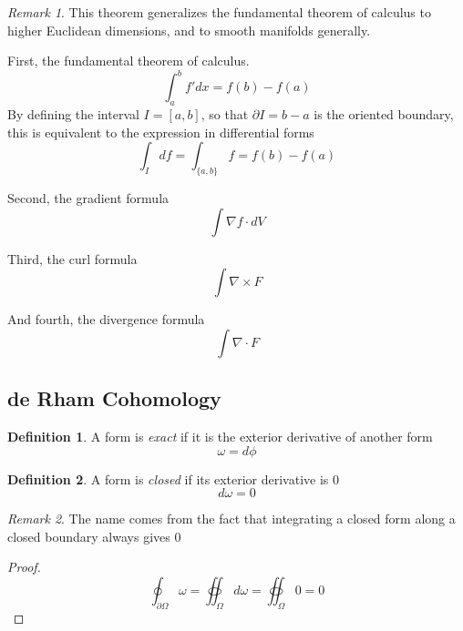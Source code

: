 \documentclass[12pt]{article}
\theoremstyle{definition}
\newtheorem{definition}{Definition}[section]
\theoremstyle{remark}
\newtheorem*{remark}{Remark}
\theoremstyle{example}
\theoremstyle{theorem}
\theoremstyle{lemma}
\begin{document}
\begin{remark}
	This theorem generalizes the fundamental theorem of calculus to higher Euclidean dimensions, and to smooth manifolds generally.
	
	First, the fundamental theorem of calculus.
	\begin{equation}
		\int_a^bf'dx=f(b)-f(a)
	\end{equation}
	By defining the interval $I=[a,b]$, so that $\partial I=b-a$ is the oriented boundary, this is equivalent to the expression in differential forms
	\begin{equation}
		\int_Idf=\int_{\{a,b\}}f=f(b)-f(a)
	\end{equation}
	
	Second, the gradient formula
	\begin{equation}
		\int\nabla f\cdot dV
	\end{equation}
	
	Third, the curl formula
	\begin{equation}
		\int\nabla\times F
	\end{equation}
	
	And fourth, the divergence formula
	\begin{equation}
		\int\nabla\cdot F
	\end{equation}
\end{remark}

\subsection{de Rham Cohomology}

\begin{definition}
	A form is \textit{exact} if it is the exterior derivative of another form
	\begin{equation}
		\omega=d\phi
	\end{equation}
\end{definition}

\begin{definition}
	A form is \textit{closed} if its exterior derivative is 0
	\begin{equation}
		d\omega=0
	\end{equation}
\end{definition}

\begin{remark}
	The name comes from the fact that integrating a closed form along a closed boundary always gives 0
	\begin{proof}
		\begin{equation}
			\oint_{\partial\Omega}\omega = \oiint_\Omega d\omega=\oiint_\Omega 0 = 0
		\end{equation}
	\end{proof}
\end{remark}
\end{document}
